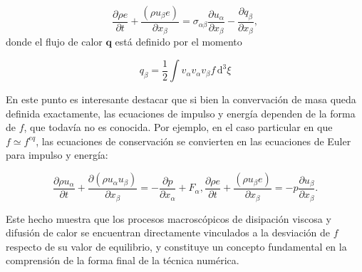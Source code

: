 \begin{equation}
	\dfrac{\partial \rho e}{\partial t} + \dfrac{(\rho u_{\beta} e)}{\partial x_{\beta}} = \sigma_{\alpha\beta} \dfrac{\partial u_{\alpha}}{\partial x_{\beta}} - \dfrac{\partial q_{\beta}}{\partial x_{\beta}},
\end{equation}
donde el flujo de calor $\bm{q}$ est\'a definido por el momento

\begin{equation}
	q_{\beta} = \dfrac{1}{2} \int v_{\alpha} v_{\alpha} v_{\beta} f \, \mbox{d}^3 \xi
\end{equation}


En este punto es interesante destacar que si bien la convervaci\'on de masa queda definida exactamente, las ecuaciones de impulso y energ\'ia dependen de la forma de $f$, que todav\'ia no es conocida. Por ejemplo, en el caso particular en que $f \simeq f^{eq}$, las ecuaciones de conservaci\'on se convierten en las ecuaciones de Euler para impulso y energ\'ia:

\begin{subequations}
	\begin{equation}
	 	\dfrac{\partial \rho u_{\alpha}}{\partial t} 
	  + \dfrac{\partial (\rho u_{\alpha} u_{\beta})}{\partial x_{\beta}} 
	  =	-\dfrac{\partial p}{\partial x_{\alpha}} + F_{\alpha} ,	
	\end{equation}
	\begin{equation}
		\dfrac{\partial \rho e}{\partial t} 
	  + \dfrac{(\rho u_{\beta} e)}{\partial x_{\beta}} 
	  = -p \dfrac{\partial u_{\beta}}{\partial x_{\beta}}.
	\end{equation}
	\label{eq:macro_euler}	
\end{subequations}

Este hecho muestra que los procesos macrosc\'opicos de disipaci\'on viscosa y difusi\'on de calor se encuentran directamente vinculados a la desviaci\'on de $f$ respecto de su valor de equilibrio, y constituye un concepto fundamental en la comprensi\'on de la forma final de la t\'ecnica num\'erica. 



